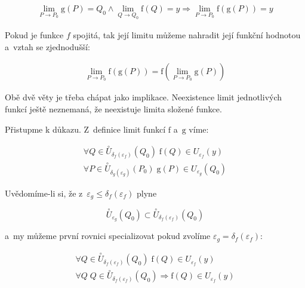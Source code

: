 \begin{equation}
\label{eq:limita_slozene_funkce}
\begin{split}
\lim_{P \to P_0} \mathrm{g}(P) = Q_0 \land \lim_{Q \to Q_0} \mathrm{f}(Q) = y \Rightarrow \lim_{P \to P_0} \mathrm{f}(\mathrm{g}(P)) = y
\end{split}
\end{equation}

Pokud je funkce \(f\) spojitá, tak její limitu můžeme nahradit její funkční hodnotou a~vztah se zjednodušší:

\begin{equation}
\label{eq:limita_spojite_slozene_funkce}
\begin{split}
\lim_{P \to P_0} \mathrm{f}(\mathrm{g}(P)) = \mathrm{f} \left( \lim_{P \to P_0} \mathrm{g}(P) \right)
\end{split}
\end{equation}

Obě dvě věty je třeba chápat jako implikace. Neexistence limit jednotlivých funkcí ještě neznemaná, že neexistuje limita složené funkce.

Přistupme k důkazu. Z~definice limit funkcí \(\mathrm{f}\) a~\(\mathrm{g}\) víme:

\begin{equation}
\begin{split}
\forall Q \in \overset{\circ}{U}_{\delta_f(\varepsilon_f)}(Q_0) \; \mathrm{f}(Q) \in U_{\varepsilon_f}(y) \\
\forall P \in \overset{\circ}{U}_{\delta_g(\varepsilon_g)}(P_0) \; \mathrm{g}(P) \in U_{\varepsilon_g}(Q_0)
\end{split}
\end{equation}

Uvědomíme-li si, že z~\(\varepsilon_g \leq \delta_f(\varepsilon_f)\) plyne

\begin{equation}
\overset{\circ}{U}_{\varepsilon_g}(Q_0) \subset \overset{\circ}{U}_{\delta_f(\varepsilon_f)}(Q_0)
\end{equation}

a~my můžeme první rovnici specializovat pokud zvolíme \(\varepsilon_g = \delta_f(\varepsilon_f)\):

\begin{equation}
\begin{split}
\forall Q \in \overset{\circ}{U}_{\delta_f(\varepsilon_f)}(Q_0) \; \mathrm{f}(Q) \in U_{\varepsilon_f}(y) \\
\forall Q \; Q \in \overset{\circ}{U}_{\delta_f(\varepsilon_f)}(Q_0) \Rightarrow \mathrm{f}(Q) \in U_{\varepsilon_f}(y)
\end{split}
\end{equation}

